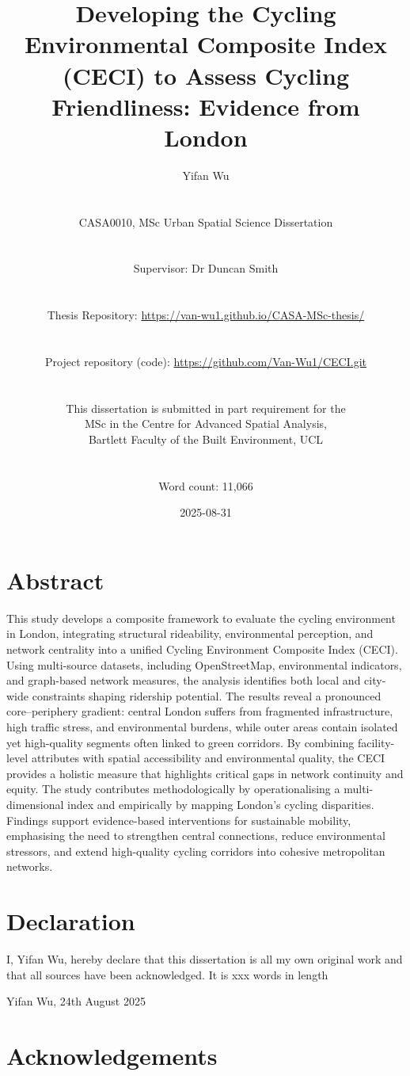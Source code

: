 \documentclass[
  12pt,
  oneside]{book}
\title{Developing the Cycling Environmental Composite Index (CECI) to Assess Cycling Friendliness: Evidence from London}
\author{Yifan Wu\\
\strut \\
CASA0010, MSc Urban Spatial Science Dissertation\\
\strut \\
Supervisor: Dr Duncan Smith\\
\strut \\
Thesis Repository: \url{https://van-wu1.github.io/CASA-MSc-thesis/}\\
\strut \\
Project repository (code): \url{https://github.com/Van-Wu1/CECI.git}\\
\strut \\
This dissertation is submitted in part requirement for the\\
MSc in the Centre for Advanced Spatial Analysis,\\
Bartlett Faculty of the Built Environment, UCL\\
\strut \\
Word count: 11,066}
\date{2025-08-31}
\begin{document}
\maketitle


\chapter*{Abstract}\label{abstract}

This study develops a composite framework to evaluate the cycling environment in London, integrating structural rideability, environmental perception, and network centrality into a unified Cycling Environment Composite Index (CECI). Using multi-source datasets, including OpenStreetMap, environmental indicators, and graph-based network measures, the analysis identifies both local and city-wide constraints shaping ridership potential. The results reveal a pronounced core--periphery gradient: central London suffers from fragmented infrastructure, high traffic stress, and environmental burdens, while outer areas contain isolated yet high-quality segments often linked to green corridors. By combining facility-level attributes with spatial accessibility and environmental quality, the CECI provides a holistic measure that highlights critical gaps in network continuity and equity. The study contributes methodologically by operationalising a multi-dimensional index and empirically by mapping London's cycling disparities. Findings support evidence-based interventions for sustainable mobility, emphasising the need to strengthen central connections, reduce environmental stressors, and extend high-quality cycling corridors into cohesive metropolitan networks.


\chapter*{Declaration}\label{declaration}

I, Yifan Wu, hereby declare that this dissertation is all my own original work and that all sources have been acknowledged. It is xxx words in length

Yifan Wu, 24th August 2025

\chapter*{Acknowledgements}\label{acknowledgements}
\end{document}
